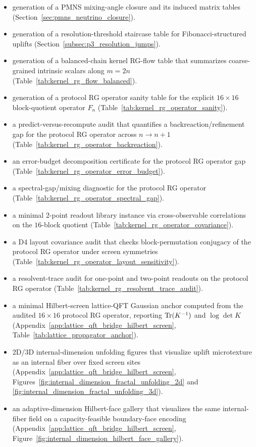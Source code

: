 \begin{itemize}
\item generation of a PMNS mixing-angle closure and its induced matrix tables (Section~\ref{sec:pmns_neutrino_closure}).
\item generation of a resolution-threshold staircase table for Fibonacci-structured uplifts (Section~\ref{subsec:p3_resolution_jumps}).
\item generation of a balanced-chain kernel RG-flow table that summarizes coarse-grained intrinsic scalars along $m=2n$ (Table~\ref{tab:kernel_rg_flow_balanced}).
\item generation of a protocol RG operator sanity table for the explicit $16\times 16$ block-quotient operator $F_n$ (Table~\ref{tab:kernel_rg_operator_sanity}).
\item a predict-versus-recompute audit that quantifies a backreaction/refinement gap for the protocol RG operator across $n\to n+1$ (Table~\ref{tab:kernel_rg_operator_backreaction}).
\item an error-budget decomposition certificate for the protocol RG operator gap (Table~\ref{tab:kernel_rg_operator_error_budget}).
\item a spectral-gap/mixing diagnostic for the protocol RG operator (Table~\ref{tab:kernel_rg_operator_spectral_gap}).
\item a minimal 2-point readout library instance via cross-observable correlations on the $16$-block quotient (Table~\ref{tab:kernel_rg_operator_covariance}).
\item a D4 layout covariance audit that checks block-permutation conjugacy of the protocol RG operator under screen symmetries (Table~\ref{tab:kernel_rg_operator_layout_sensitivity}).
\item a resolvent-trace audit for one-point and two-point readouts on the protocol RG operator (Table~\ref{tab:kernel_rg_resolvent_trace_audit}).
\item \AuditTag a minimal Hilbert-screen lattice-QFT Gaussian anchor computed from the audited $16\times 16$ protocol RG operator, reporting $\mathrm{Tr}(K^{-1})$ and $\log\det K$ (Appendix~\ref{app:lattice_qft_bridge_hilbert_screen}, Table~\ref{tab:lattice_propagator_anchor}).
\item \AuditTag 2D/3D internal-dimension unfolding figures that visualize uplift microtexture as an internal fiber over fixed screen sites (Appendix~\ref{app:lattice_qft_bridge_hilbert_screen}, Figures~\ref{fig:internal_dimension_fractal_unfolding_2d} and \ref{fig:internal_dimension_fractal_unfolding_3d}).
\item \AuditTag an adaptive-dimension Hilbert-face gallery that visualizes the same internal-fiber field on a capacity-feasible boundary-face encoding (Appendix~\ref{app:lattice_qft_bridge_hilbert_screen}, Figure~\ref{fig:internal_dimension_hilbert_face_gallery}).

\end{itemize}
